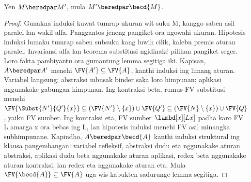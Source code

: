 \documentclass[../../../include/open-logic-section]{subfiles}
\begin{document}
\begin{lem}
  Yen $M \beredpar M'$,
  mula $M' \beredpar \becd{M}$.
\end{lem}

\begin{proof}
  Gunakna induksi kuwat tumrap ukuran wit suku M, kanggo saben asil paralel lan wakil alfa. Panggantos jeneng pangiket ora ngowahi ukuran. Hipotesis induksi lumaku tumrap saben subsuku kang luwih cilik, kalebu premis aturan paralel. Invariansi alfa lan teorema substitusi ngidinaké pilihan pangiket seger.
  Loro fakta pambiyantu ora gumantung lemma segitiga iki. Kapisan, $A\beredpar A'$ menehi $\FV{A'}\subseteq\FV{A}$, kanthi induksi ing limang aturan. Variabel langsung; abstraksi mbusak binder saka loro himpunan; aplikasi nggunakake gabungan himpunan. Ing kontraksi beta, rumus FV substitusi menehi $\FV{\Subst{N'}{Q'}{x}}\subseteq(\FV{N'}\setminus\{x\})\cup\FV{Q'}\subseteq(\FV{N}\setminus\{x\})\cup\FV{Q}$, yaiku FV sumber. Ing kontraksi eta, FV sumber $\lambd[x][Lx]$ padha karo FV L amarga x ora bebas ing L, lan hipotesis induksi menehi FV asil minangka subhimpunane. Kapindho, $A\beredpar\becd{A}$ kanthi induksi struktural ing klausa pangembangan: variabel refleksif, abstraksi dudu eta nggunakake aturan abstraksi, aplikasi dudu beta nggunakake aturan aplikasi, redex beta nggunakake aturan kontraksi, lan redex eta nggunakake aturan eta. Mula $\FV{\becd{A}}\subseteq\FV{A}$ uga wis kabukten sadurunge lemma segitiga.


\end{proof}
\end{document}
